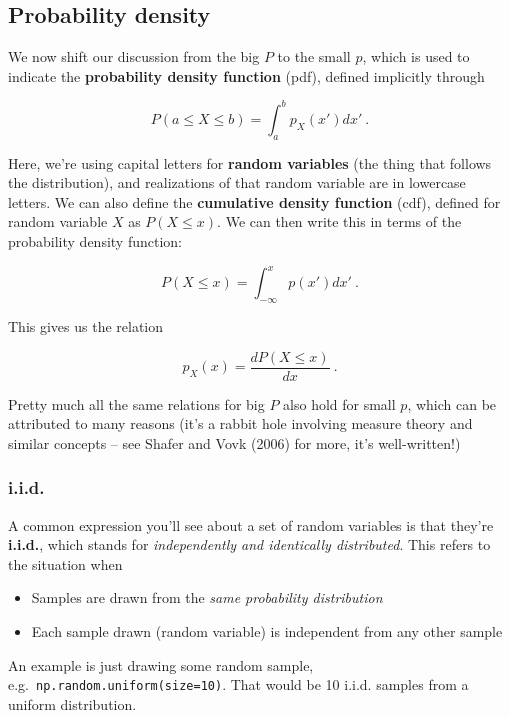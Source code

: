 \documentclass[
  11pt,
  numbers=noendperiod]{book}
\providecommand{\tightlist}{%
  \setlength{\itemsep}{0pt}\setlength{\parskip}{0pt}}\usepackage{longtable,booktabs,array}
\begin{document}
\hypertarget{probability-density}{%
\subsection{Probability density}\label{probability-density}}

We now shift our discussion from the big \(P\) to the small \(p\), which
is used to indicate the \textbf{probability density function} (pdf),
defined implicitly through

\[
P(a \leqslant X \leqslant b) = \int_{a}^{b} p_X(x') dx'~.
\]

Here, we're using capital letters for \textbf{random variables} (the
thing that follows the distribution), and realizations of that random
variable are in lowercase letters. We can also define the
\textbf{cumulative density function} (cdf), defined for random variable
\(X\) as \(P(X \leq x)\). We can then write this in terms of the
probability density function:

\[
P(X \leqslant x) = \int_{-\infty}^{x} p(x') dx'~.
\]

This gives us the relation

\[
p_X(x) = \frac{dP(X \leqslant x)}{dx}~.
\]

Pretty much all the same relations for big \(P\) also hold for small
\(p\), which can be attributed to many reasons (it's a rabbit hole
involving measure theory and similar concepts -- see Shafer and Vovk
(2006) for more, it's well-written!)

\hypertarget{i.i.d.}{%
\subsubsection{i.i.d.}\label{i.i.d.}}

A common expression you'll see about a set of random variables is that
they're \textbf{i.i.d.}, which stands for \emph{independently and
identically distributed}. This refers to the situation when

\begin{itemize}
\tightlist
\item
  Samples are drawn from the \emph{same probability distribution}
\item
  Each sample drawn (random variable) is independent from any other
  sample
\end{itemize}

An example is just drawing some random sample,
e.g.~\texttt{np.random.uniform(size=10)}. That would be 10 i.i.d.
samples from a uniform distribution.
\end{document}

